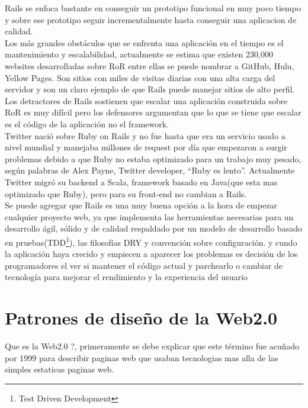     Rails se enfoca bastante en conseguir un prototipo funcional en muy poco tiempo 
    y sobre ese prototipo seguir incrementalmente hasta conseguir una aplicacion 
    de calidad.\\

    Los más grandes obstáculos que se enfrenta una aplicación en el tiempo es el 
    mantenimiento y escalabilidad, actualmente se estima que existen 230,000 websites\cite{web2} 
    desarrolladas sobre RoR %
    entre ellas se puede nombrar a GitHub, Hulu, Yellow Pages. Son sitios con miles de visitas diarias
    con una alta carga del servidor y son un claro ejemplo de que Rails puede manejar sitios de alto perfil.\\

    Los detractores de Rails sostienen que escalar una aplicación construida 
    sobre RoR es muy difícil pero los defensores argumentan que lo que se 
    tiene que escalar es el código de la aplicación no el framework.\\

    Twitter nació sobre Ruby on  Rails  y no fue hasta que era un servicio usado 
    a nivel mundial y manejaba millones de request por día que empezaron a surgir 
    problemas debido a que Ruby no estaba optimizado para un trabajo muy pesado, 
    según palabras de Alex Payne, Twitter developer, “Ruby es lento”\cite{web3}. 
    Actualmente Twitter migró su backend a Scala, framework basado en Java(que esta mas optimizado que Ruby),
    pero para su front-end no cambian a Rails.\cite{web4}\\
    
    Se puede agregar que Rails es una muy buena opción a la hora de empezar 
    cualquier proyecto web, ya que implementa las herramientas necesarias 
    para un desarrollo ágil, sólido y de calidad respaldado por un modelo 
    de desarrollo basado en pruebas(TDD\footnote{Test Driven Development}), las filosofías DRY y convención sobre configuración.
    y cundo la aplicaci\'on haya crecido y empiecen a aparecer los problemas es 
    decisión de los programadores el ver si mantener el código actual y parchearlo o 
    cambiar de tecnología para mejorar el rendimiento y la experiencia del usuario\\

  \section{Patrones de diseño de la Web2.0} %
  \label{sec:patrones_web20}
    Que es la Web2.0 ?,  primeramente  se debe explicar que este término fue acuñado 
    por 1999 para describir paginas web que usaban tecnologias mas alla de las 
    simples estaticas paginas web.\\
    

